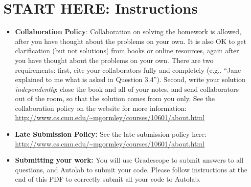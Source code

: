 \documentclass[11pt]{article}
\numberwithin{equation}{section} %
\numberwithin{figure}{section} %
\numberwithin{table}{section} %
\begin{document}
\section*{START HERE: Instructions}
\begin{itemize}

\item \textbf{Collaboration Policy}: Collaboration on solving the homework is allowed, after you have thought about the problems on your own. It is also OK to get clarification (but not solutions) from books or online resources, again after you have thought about the problems on your own. There are two requirements: first, cite your collaborators fully and completely (e.g., ``Jane explained to me what is asked in Question 3.4''). Second, write your solution {\em independently}: close the book and all of your notes, and send collaborators out of the room, so that the solution comes from you only.  See the collaboration policy on the website for more information: \url{http://www.cs.cmu.edu/~mgormley/courses/10601/about.html}
\item\textbf{Late Submission Policy:} See the late submission policy
  here:
  \url{http://www.cs.cmu.edu/~mgormley/courses/10601/about.html}

\item\textbf{Submitting your work:} You will use Gradescope to submit
  answers to all questions, and Autolab to submit your code. Please
  follow instructions at the end of this PDF to correctly submit all your code to Autolab.

  \begin{itemize}
    
\begin{comment}
  \item \textbf{Canvas:} Canvas (\url{https://canvas.cmu.edu}) will be
    used for quiz-style problems (e.g. multiple choice, true / false,
    numerical answers). Grading is done automatically.
    You may only \textbf{submit once} on canvas, so be sure of your
    answers before you submit. However, canvas allows you to work on
    your answers and then close out of the page and it will save your
    progress.  You will not be granted additional submissions, so
    please be confident of your solutions when you are submitting your
    assignment.
    {\color{red} The above is true for future assignments, but this one
    allows {\bf unlimited submissions}.}
\end{comment}
    

\end{itemize}
\end{itemize}
\end{document}
